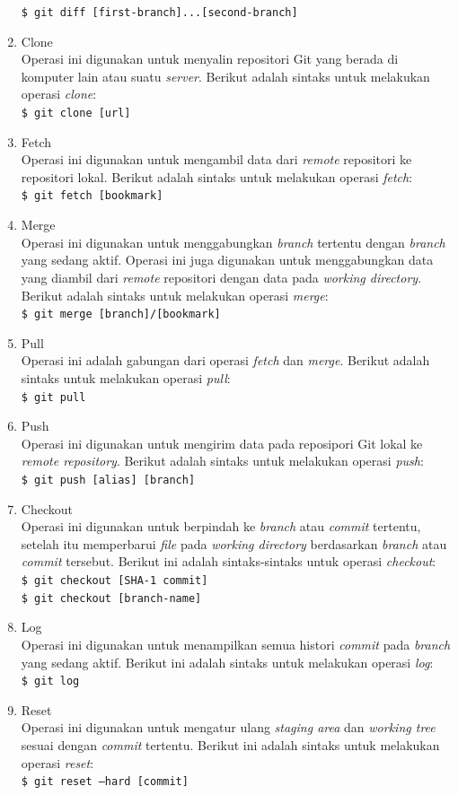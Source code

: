 \begin{enumerate}
\texttt{\$ git diff [first-branch]...[second-branch]}
\item Clone\\
Operasi ini digunakan untuk menyalin repositori Git yang berada di komputer lain atau suatu \textit{server}. Berikut adalah sintaks untuk melakukan operasi \textit{clone}:\\
\texttt{\$ git clone [url]}
\item Fetch\\
Operasi ini digunakan untuk mengambil data dari \textit{remote} repositori ke repositori lokal. Berikut adalah sintaks untuk melakukan operasi \textit{fetch}:\\
\texttt{\$ git fetch [bookmark]}
\item Merge\\
Operasi ini digunakan untuk menggabungkan \textit{branch} tertentu dengan \textit{branch} yang sedang aktif. Operasi ini juga digunakan untuk menggabungkan data yang diambil dari \textit{remote} repositori dengan data pada \textit{working directory}. Berikut adalah sintaks untuk melakukan operasi \textit{merge}:\\
\texttt{\$ git merge [branch]/[bookmark]}
\item Pull\\
Operasi ini adalah gabungan dari operasi \textit{fetch} dan \textit{merge}. Berikut adalah sintaks untuk melakukan operasi \textit{pull}:\\
\texttt{\$ git pull}
\item Push\\
Operasi ini digunakan untuk mengirim data pada reposipori Git lokal ke \textit{remote repository}.
Berikut adalah sintaks untuk melakukan operasi \textit{push}:\\
\texttt{\$ git push [alias] [branch]}
\item Checkout\\
Operasi ini digunakan untuk berpindah ke \textit{branch} atau \textit{commit} tertentu, setelah itu memperbarui \textit{file} pada \textit{working directory} berdasarkan \textit{branch} atau \textit{commit} tersebut. Berikut ini adalah sintaks-sintaks untuk operasi \textit{checkout}:\\
\texttt{\$ git checkout [SHA-1 commit]}\\
\texttt{\$ git checkout [branch-name]}
\item Log\\
Operasi ini digunakan untuk menampilkan semua histori \textit{commit} pada \textit{branch} yang sedang aktif. Berikut ini adalah sintaks untuk melakukan operasi \textit{log}:\\
\texttt{\$ git log}

\item Reset\\
Operasi ini digunakan untuk mengatur ulang \textit{staging area} dan \textit{working tree} sesuai dengan \textit{commit} tertentu. Berikut ini adalah sintaks untuk melakukan operasi \textit{reset}:\\
\texttt{\$ git reset --hard [commit]}
\end{enumerate}
